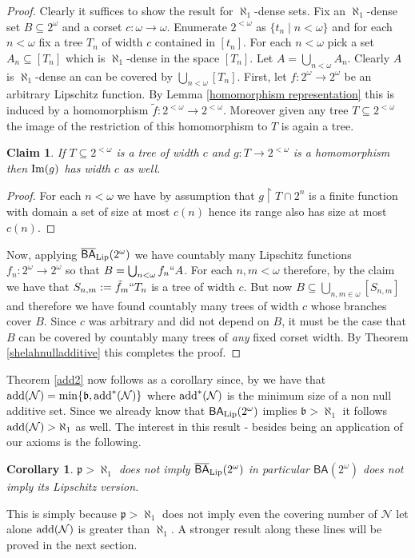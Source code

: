 \documentclass[leqno,11pt]{amsart}
\newtheorem{corollary}[theorem]{Corollary}
\newtheorem{claim}[theorem]{Claim}
\theoremstyle{definition}
\theoremstyle{remark}
\def\hook{\upharpoonright}
\def\Null{\mathcal N}
\def\BA{\mathsf{BA}}
\def\cantor{2^\omega}
\def\mfb{\mathfrak b}
\def\mfp{\mathfrak{p}}
\def\add{{\rm add}}
\begin{document}
\begin{proof}
    Clearly it suffices to show the result for $\aleph_1$-dense sets. Fix an $\aleph_1$-dense set $B \subseteq \cantor$ and a corset $c:\omega\to \omega$. Enumerate $2^{<\omega}$ as $\{t_n\mid n < \omega\}$ and for each $n < \omega$ fix a tree $T_n$ of width $c$ contained in $[t_n]$. For each $n < \omega$ pick a set $A_n \subseteq [T_n]$ which is $\aleph_1$-dense in the space $[T_n]$. Let $A = \bigcup_{n < \omega} A_n$. Clearly $A$ is $\aleph_1$-dense an can be covered by $\bigcup_{n < \omega}[T_n]$. First, let $f:\cantor \to \cantor$ be an arbitrary Lipschitz function. By Lemma \ref{homomorphism representation} this is induced by a homomorphism $\tilde{f}:2^{<\omega} \to 2^{< \omega}$. Moreover given any tree $T \subseteq 2^{<\omega}$ the image of the restriction of this homomorphism to $T$ is again a tree. 

    
    \begin{claim}
        If $T \subseteq 2^{<\omega}$ is a tree of width $c$ and $g:T \to 2^{<\omega}$ is a homomorphism then ${\rm Im}(g)$ has width $c$ as well.
    \end{claim}

    \begin{proof}
        For each $n < \omega$ we have by assumption that $g\hook T \cap 2^n$ is a finite function with domain a set of size at most $c(n)$ hence its range also has size at most $c(n)$. 
    \end{proof}
    
       Now, applying $\overline{\BA}_{\rm Lip}(\cantor)$ we have countably many Lipschitz functions $f_n:\cantor \to \cantor$ so that $B = \bigcup_{n < \omega} f_n``A$. For each $n, m < \omega$ therefore, by the claim we have that $S_{n, m}:= \tilde{f}_m``T_n$ is a tree of width $c$. But now $B \subseteq \bigcup_{n, m \in \omega} [S_{n, m}]$ and therefore we have found countably many trees of width $c$ whose branches cover $B$. Since $c$ was arbitrary and did not depend on $B$, it must be the case that $B$ can be covered by countably many trees of {\em any} fixed corset width. By Theorem \ref{shelahnulladditive} this completes the proof.
\end{proof}

Theorem \ref{add2} now follows as a corollary since, by \cite[Theorem 2.7.13]{BarJu95} we have that $\add(\Null) = {\rm min}\{\mfb, \add^*(\Null)\}$ where $\add^*(\Null)$ is the minimum size of a non null additive set. Since we already know that $\BA_{\rm Lip}(\cantor)$ implies $\mfb > \aleph_1$ it follows $\add(\Null) > \aleph_1$ as well. The interest in this result - besides being an application of our axioms is the following.
\begin{corollary}
    $\mfp > \aleph_1$ does not imply $\overline{\BA}_{\rm Lip}(\cantor)$ in particular $\BA(\cantor)$ does not imply its Lipschitz version. 
\end{corollary}
This is simply because $\mfp > \aleph_1$ does not imply even the covering number of $\Null$ let alone $\add(\Null)$ is greater than $\aleph_1$. A stronger result along these lines will be proved in the next section.
\end{document}
